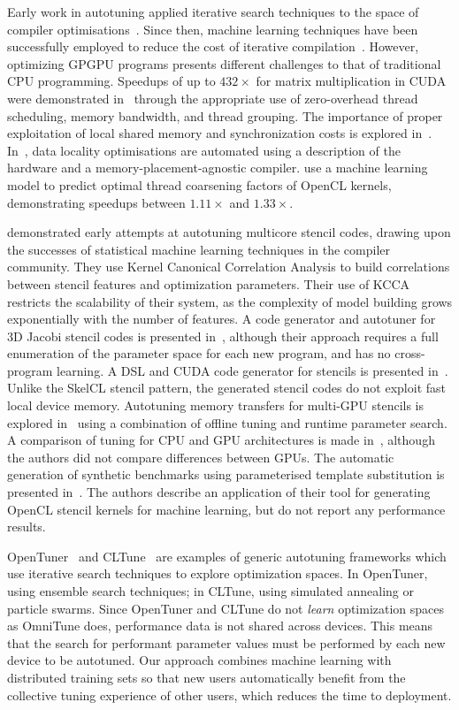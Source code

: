 Early work in autotuning applied iterative search techniques to the
space of compiler optimisations~\cite{Bodin1998,Kisuki}. Since then,
machine learning techniques have been successfully employed to reduce
the cost of iterative
compilation~\cite{Agakov,Stephenson2003,Fursin2011}. However,
optimizing GPGPU programs presents different challenges to that of
traditional CPU programming. Speedups of up to $432\times$ for matrix
multiplication in CUDA were demonstrated in~\cite{Ryoo2008a} through
the appropriate use of zero-overhead thread scheduling, memory
bandwidth, and thread grouping. The importance of proper exploitation
of local shared memory and synchronization costs is explored
in~\cite{Lee2010}. In~\cite{Chen2014}, data locality optimisations are
automated using a description of the hardware and a
memory-placement-agnostic compiler. \cite{Magni2014} use a machine
learning model to predict optimal thread coarsening factors of OpenCL
kernels, demonstrating speedups between $1.11\times$ and $1.33\times$.

\cite{Ganapathi2009} demonstrated early attempts at autotuning
multicore stencil codes, drawing upon the successes of statistical
machine learning techniques in the compiler community. They use Kernel
Canonical Correlation Analysis to build correlations between stencil
features and optimization parameters. Their use of KCCA restricts the
scalability of their system, as the complexity of model building grows
exponentially with the number of features. A code generator and
autotuner for 3D Jacobi stencil codes is presented
in~\cite{Zhang2013a}, although their approach requires a full
enumeration of the parameter space for each new program, and has no
cross-program learning. A DSL and CUDA code generator for stencils is
presented in~\cite{Kamil2010}. Unlike the SkelCL stencil pattern, the
generated stencil codes do not exploit fast local device
memory. Autotuning memory transfers for multi-GPU stencils is explored
in~\cite{Lutz2013} using a combination of offline tuning and runtime
parameter search. A comparison of tuning for CPU and GPU architectures
is made in~\cite{Christen2011}, although the authors did not compare
differences between GPUs. The automatic generation of synthetic
benchmarks using parameterised template substitution is presented
in~\cite{Chiu2015}. The authors describe an application of their tool
for generating OpenCL stencil kernels for machine learning, but do not
report any performance results.

OpenTuner~\cite{Ansel2013} and CLTune~\cite{Nugteren2015} are examples
of generic autotuning frameworks which use iterative search techniques
to explore optimization spaces. In OpenTuner, using ensemble search
techniques; in CLTune, using simulated annealing or particle
swarms. Since OpenTuner and CLTune do not \emph{learn} optimization
spaces as OmniTune does, performance data is not shared across
devices. This means that the search for performant parameter values
must be performed by each new device to be autotuned. Our approach
combines machine learning with distributed training sets so that new
users automatically benefit from the collective tuning experience of
other users, which reduces the time to deployment.

